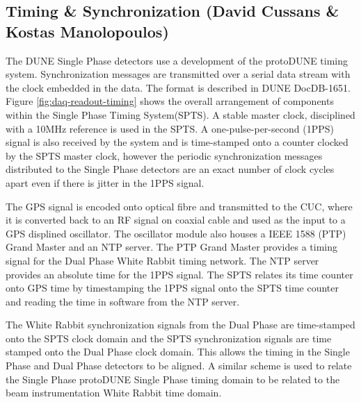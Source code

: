 
%
%
%

\subsection{Timing \& Synchronization (David Cussans \& Kostas Manolopoulos)}
\label{sec:fdsp-daq-timing}


The DUNE Single Phase detectors use a development of the protoDUNE
timing system. Synchronization messages are transmitted over a serial
data stream with the clock embedded in the data. The format is
described in DUNE DocDB-1651. Figure \ref{fig:daq-readout-timing}
shows the overall arrangement of components within the Single Phase
Timing System(SPTS). A stable master clock, disciplined with a 10MHz
reference is used in the SPTS. A one-pulse-per-second (1PPS) signal is
also received by the system and is time-stamped onto a counter clocked
by the SPTS master clock, however the periodic synchronization
messages distributed to the Single Phase detectors are an exact number
of clock cycles apart even if there is jitter in the 1PPS signal.

The GPS signal is encoded onto optical fibre and transmitted to the
CUC, where it is converted back to an RF signal on coaxial cable and
used as the input to a GPS displined oscillator. The oscillator module
also houses a IEEE 1588 (PTP) Grand Master and an NTP server. The PTP
Grand Master provides a timing signal for the Dual Phase White Rabbit
timing network. The NTP server provides an absolute time for the 1PPS
signal. The SPTS relates its time counter onto GPS time by
timestamping the 1PPS signal onto the SPTS time counter and reading
the time in software from the NTP server.

The White Rabbit synchronization signals from the Dual Phase are
time-stamped onto the SPTS clock domain and the SPTS synchronization
signals are time stamped onto the Dual Phase clock domain. This allows
the timing in the Single Phase and Dual Phase detectors to be
aligned. A similar scheme is used to relate the Single Phase protoDUNE
Single Phase timing domain to be related to the beam instrumentation
White Rabbit time domain.

